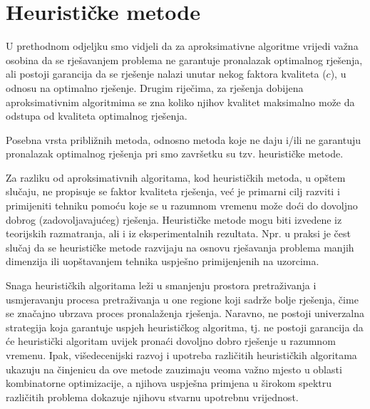 \documentclass[a4paper, utf8, 11pt, colorlinks]{book}
\theoremstyle{definition}
\begin{document}

  
\section{Heurističke metode}
 U prethodnom odjeljku smo vidjeli da za aproksimativne algoritme vrijedi važna osobina da se rješavanjem problema ne garantuje pronalazak optimalnog rješenja, ali postoji garancija da se rješenje nalazi unutar nekog faktora kvaliteta ($c$), u odnosu na optimalno rješenje.  
 Drugim riječima, za rješenja dobijena aproksimativnim algoritmima se zna koliko njihov kvalitet maksimalno može da odstupa od kvaliteta optimalnog rješenja. 
 
 Posebna vrsta približnih metoda, odnosno metoda koje ne daju i/ili ne garantuju pronalazak optimalnog rješenja pri smo završetku su tzv. heurističke metode. 
 
 Za razliku od aproksimativnih algoritama, kod heurističkih metoda, u opštem slučaju, ne propisuje se faktor kvaliteta rješenja, već je primarni cilj razviti i primijeniti tehniku pomoću koje se u razumnom vremenu može doći do dovoljno dobrog (zadovoljavajućeg) rješenja. Heurističke metode mogu biti izvedene iz teorijskih razmatranja, ali i iz eksperimentalnih rezultata. Npr. u praksi je čest slučaj da se heurističke metode razvijaju na osnovu rješavanja problema manjih dimenzija ili uopštavanjem tehnika uspješno primijenjenih na uzorcima. 
 
 
 Snaga heurističkih algoritama leži u smanjenju prostora pretraživanja i usmjeravanju procesa pretraživanja u one regione koji sadrže bolje rješenja, čime se značajno ubrzava proces pronalaženja rješenja. Naravno, ne postoji univerzalna strategija koja garantuje uspjeh heurističkog algoritma, tj. ne postoji garancija da će heuristički algoritam uvijek pronaći dovoljno dobro rješenje u razumnom vremenu. Ipak, višedecenijski razvoj i upotreba različitih heurističkih algoritama ukazuju na činjenicu da ove metode zauzimaju veoma važno mjesto u oblasti kombinatorne optimizacije, a njihova uspješna primjena u širokom spektru različitih problema dokazuje njihovu stvarnu upotrebnu vrijednost.
 
\end{document}

